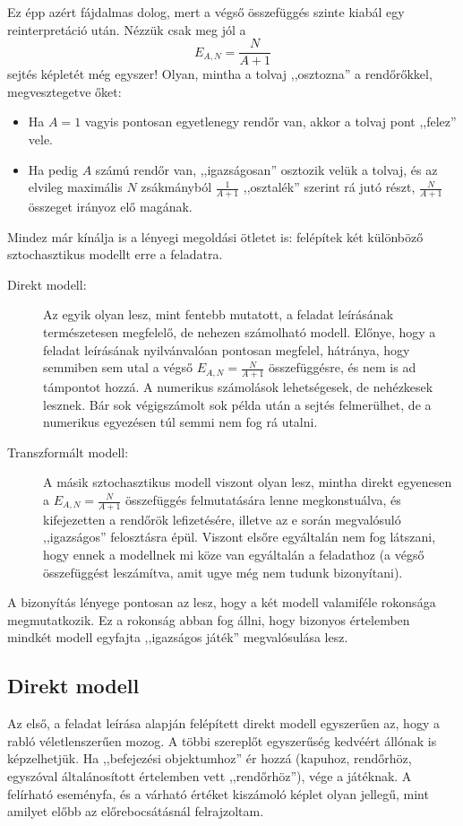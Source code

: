 \documentclass{article}
\begin{document}
	Ez épp azért fájdalmas dolog, mert a végső összefüggés szinte kiabál egy reinterpretáció után.
	Nézzük csak meg jól a \[E_{A,N} = \frac N{A+1}\] sejtés képletét még egyszer!
	Olyan, mintha a tolvaj ,,osztozna'' a rendőrőkkel, megvesztegetve őket:
	\begin{itemize}
		\item Ha $A=1$ vagyis pontosan egyetlenegy rendőr van, akkor a tolvaj pont ,,felez'' vele.
		\item Ha pedig $A$ számú rendőr van, ,,igazságosan'' osztozik velük a tolvaj, és az elvileg maximális $N$ zsákmányból $\frac1{A+1}$ ,,osztalék'' szerint rá jutó részt, $\frac N{A+1}$ összeget irányoz elő magának.
	\end{itemize}


	Mindez már kínálja is a lényegi megoldási ötletet is: felépítek két különböző sztochasztikus modellt erre a feladatra.
	\begin{description}
		\item[Direkt modell:]
		Az egyik olyan lesz, mint  fentebb mutatott, a feladat leírásának természetesen megfelelő, de nehezen számolható modell.
		Előnye, hogy a feladat leírásának nyilvánvalóan pontosan megfelel, hátránya, hogy semmiben sem utal a végső $E_{A,N} = \frac N{A+1}$ összefüggésre, és nem is ad támpontot hozzá.
		A numerikus számolások lehetségesek, de nehézkesek lesznek. Bár sok végigszámolt sok példa után a sejtés felmerülhet, de a numerikus egyezésen túl semmi nem fog rá utalni.
		\item[Transzformált modell:]
		A másik sztochasztikus modell viszont olyan lesz, mintha direkt egyenesen a $E_{A,N} = \frac N{A+1}$ összefüggés felmutatására lenne megkonstuálva,
		és kifejezetten a rendőrök lefizetésére, illetve az e során megvalósuló ,,igazságos'' felosztásra épül.
		Viszont elsőre  egyáltalán nem fog látszani, hogy ennek a modellnek mi köze van egyáltalán a feladathoz
		(a végső összefüggést leszámítva, amit ugye még nem tudunk bizonyítani).
	\end{description}
	A bizonyítás lényege pontosan az lesz, hogy a két modell valamiféle rokonsága megmutatkozik. Ez a rokonság abban fog állni, hogy bizonyos értelemben mindkét modell egyfajta ,,igazságos játék'' megvalósulása lesz.

	\subsection{Direkt modell}

	Az első, a feladat leírása alapján felépített direkt modell egyszerűen az, hogy a rabló véletlenszerűen mozog.
	A többi szereplőt egyszerűség kedvéért állónak is képzelhetjük.
	Ha ,,befejezési objektumhoz'' ér hozzá (kapuhoz, rendőrhöz, egyszóval általánosított értelemben vett ,,rendőrhöz''), vége a játéknak.
	A felírható eseményfa, és a várható értéket kiszámoló képlet olyan jellegű, mint amilyet előbb az előrebocsátásnál felrajzoltam.
\end{document}
